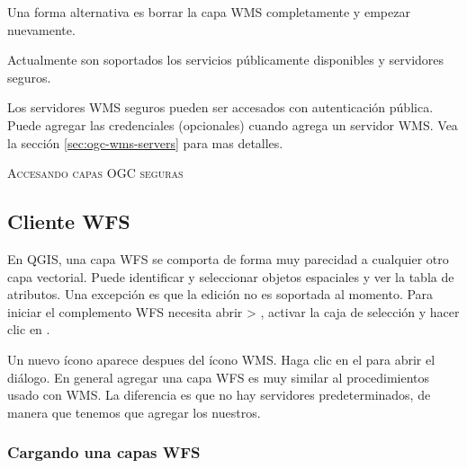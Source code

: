 Una forma alternativa es borrar la capa WMS completamente y empezar nuevamente.


Actualmente son soportados los servicios públicamente disponibles y servidores seguros.

Los servidores WMS seguros pueden ser accesados con autenticación pública. Puede agregar las credenciales (opcionales) cuando agrega un servidor WMS. Vea la sección \ref{sec:ogc-wms-servers} para mas detalles.

\begin{Tip}[ht]\caption{\textsc{Accesando capas OGC seguras}}
\end{Tip}


\subsection{Cliente WFS}\label{sec:ogc-wfs}

En QGIS, una capa WFS se comporta de forma muy parecidad a cualquier otro capa vectorial. Puede identificar y seleccionar objetos espaciales y ver la tabla de atributos. Una excepción es que la edición no es soportada al momento. Para iniciar el complemento WFS  necesita abrir  > , 
activar la caja de selección  y hacer clic en . 

Un nuevo ícono aparece  despues del ícono WMS. Haga clic en el para abrir el diálogo. En general agregar una capa WFS es muy similar al procedimientos usado con WMS. La diferencia es que no hay servidores predeterminados, de manera que tenemos que agregar los nuestros.

\subsubsection{Cargando una capas WFS}

